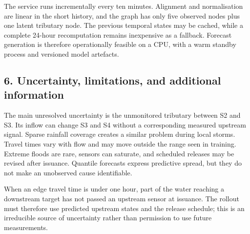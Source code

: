 \documentclass{article}
\begin{document}
The service runs incrementally every ten minutes. Alignment and normalisation are linear in the short history, and the graph has only five observed nodes plus one latent tributary node. The previous temporal states may be cached, while a complete 24-hour recomputation remains inexpensive as a fallback. Forecast generation is therefore operationally feasible on a CPU, with a warm standby process and versioned model artefacts.

\subsection*{6. Uncertainty, limitations, and additional information}

The main unresolved uncertainty is the unmonitored tributary between S2 and S3. Its inflow can change S3 and S4 without a corresponding measured upstream signal. Sparse rainfall coverage creates a similar problem during local storms. Travel times vary with flow and may move outside the range seen in training. Extreme floods are rare, sensors can saturate, and scheduled releases may be revised after issuance. Quantile forecasts express predictive spread, but they do not make an unobserved cause identifiable.

When an edge travel time is under one hour, part of the water reaching a downstream target has not passed an upstream sensor at issuance. The rollout must therefore use predicted upstream states and the release schedule; this is an irreducible source of uncertainty rather than permission to use future measurements.
\end{document}
